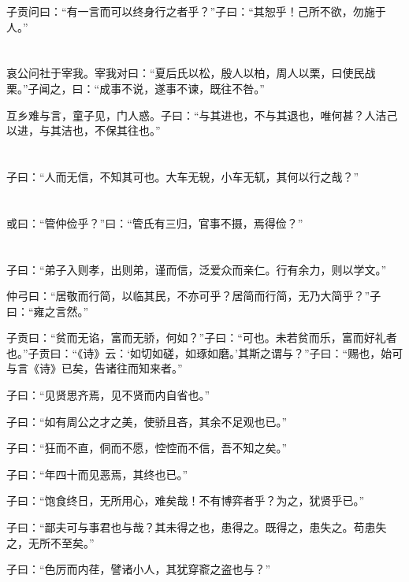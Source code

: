 \documentclass[a5paper]{ctexbook}
\begin{document}
    子贡问曰：“有一言而可以终身行之者乎？”子曰：“其恕乎！己所不欲，勿施于人。”

    \chapter{}

    哀公问社于宰我。宰我对曰：“夏后氏以松，殷人以柏，周人以栗，曰使民战栗。”子闻之，曰：“成事不说，遂事不谏，既往不咎。”

    互乡难与言，童子见，门人惑。子曰：“与其进也，不与其退也，唯何甚？人洁己以进，与其洁也，不保其往也。”

    \chapter{}

    子曰：“人而无信，不知其可也。大车无𫐐，小车无𫐄，其何以行之哉？”

    \chapter{}

    或曰：“管仲俭乎？”曰：“管氏有三归，官事不摄，焉得俭？”

    \chapter{}

    子曰：“弟子入则孝，出则弟，谨而信，泛爱众而亲仁。行有余力，则以学文。”

    仲弓曰：“居敬而行简，以临其民，不亦可乎？居简而行简，无乃大简乎？”子曰：“雍之言然。”

    子贡曰：“贫而无谄，富而无骄，何如？”子曰：“可也。未若贫而乐，富而好礼者也。”子贡曰：“《诗》云：‘如切如磋，如琢如磨。’其斯之谓与？”子曰：“赐也，始可与言《诗》已矣，告诸往而知来者。”

    子曰：“见贤思齐焉，见不贤而内自省也。”

    子曰：“如有周公之才之美，使骄且吝，其余不足观也已。”

    子曰：“狂而不直，侗而不愿，悾悾而不信，吾不知之矣。”

    子曰：“年四十而见恶焉，其终也已。”

    子曰：“饱食终日，无所用心，难矣哉！不有博弈者乎？为之，犹贤乎已。”

    子曰：“鄙夫可与事君也与哉？其未得之也，患得之。既得之，患失之。苟患失之，无所不至矣。”

    子曰：“色厉而内荏，譬诸小人，其犹穿窬之盗也与？”
\end{document}
